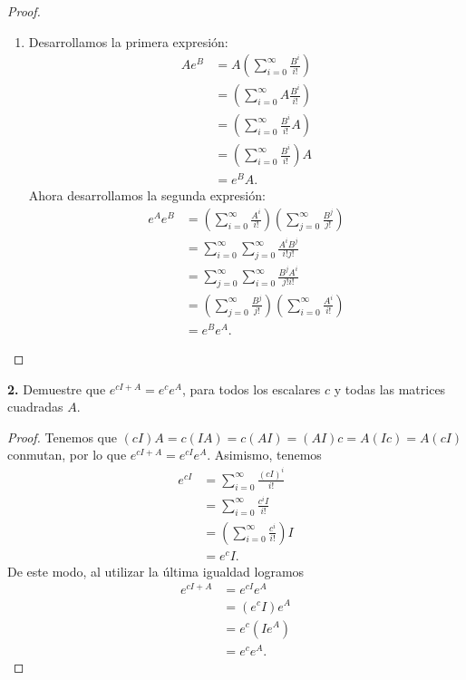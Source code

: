 \documentclass{article}
\newenvironment{statement}[1]{\smallskip\noindent\color[rgb]{1.00,0.00,0.50} {\bf #1.}}{}
\theoremstyle{definition}
\theoremstyle{remark}
\begin{document}
\begin{proof}
\begin{enumerate}
    \item Desarrollamos la primera expresi\'on:
    \begin{align*}
      A e^B &= A \left(\sum_{i = 0}^{\infty} \frac{B^i}{i!}\right)\\
      &= \left(\sum_{i = 0}^{\infty} A \frac{B^i}{i!}\right)\\
      &= \left(\sum_{i = 0}^{\infty} \frac{B^i}{i!} A\right)\\
      &= \left(\sum_{i = 0}^{\infty} \frac{B^i}{i!}\right) A\\
      &= e^B A.
    \end{align*}
    Ahora desarrollamos la segunda expresi\'on:
    \begin{align*}
      e^A e^B &= \left(\sum_{i = 0}^{\infty} \frac{A^i}{i!}\right)\left(\sum_{j = 0}^{\infty} \frac{B^j}{j!}\right)\\
      &= \sum_{i = 0}^{\infty} \sum_{j = 0}^{\infty} \frac{A^i B^j}{i! j!}\\
      &= \sum_{j = 0}^{\infty} \sum_{i = 0}^{\infty} \frac{B^j A^i}{j! i!}\\
      &= \left(\sum_{j = 0}^{\infty} \frac{B^j}{j!}\right)\left(\sum_{i = 0}^{\infty} \frac{A^i}{i!}\right)\\
      &= e^B e^A.
    \end{align*}
  \end{enumerate}
\end{proof}

\begin{statement}{2}
  Demuestre que $e^{c I  + A} = e^c e^A$, para todos los escalares $c$ y todas
  las matrices cuadradas $A$.
\end{statement}

\begin{proof}
  Tenemos que $(c I) A = c (I A) = c (A I) = (A I) c = A (I c) = A (c I)$ conmutan,
  por lo que $e^{c I + A} = e^{c I} e^A$. Asimismo, tenemos
  \begin{align*}
    e^{cI} &= \sum_{i = 0}^{\infty} \frac{(c I)^i}{i!}\\
    &= \sum_{i = 0}^{\infty} \frac{c^i I}{i!}\\
    &= \left(\sum_{i = 0}^{\infty} \frac{c^i}{i!}\right) I\\
    &= e^c I.
  \end{align*}
  De este modo, al utilizar la \'ultima igualdad logramos
  \begin{align*}
    e^{c I + A} &= e^{c I} e^A\\
    &= (e^c I) e^A\\
    &= e^c (I e^A)\\
    &= e^c e^A.
  \end{align*}
\end{proof}
\end{document}

